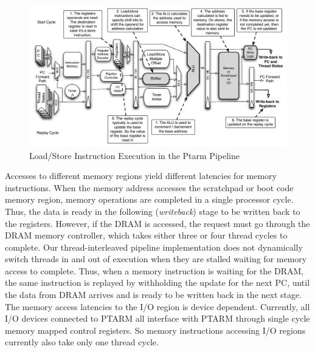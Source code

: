 \begin{figure}[h]
  \begin{center}
    \includegraphics[scale=.54]{figs/ldstr_pipeline_implementation}
  \end{center}
  \vspace{-3mm}
  \caption{Load/Store Instruction Execution in the Ptarm Pipeline}
  \label{fig:ldstr_pipeline_implementation}
\end{figure}

Accesses to different memory regions yield different latencies for memory instructions.
When the memory address accesses the scratchpad or boot code memory region, memory operations are completed in a single processor cycle.
Thus, the data is ready in the following (\emph{writeback}) stage to be written back to the registers.
However, if the DRAM is accessed, the request must go through the DRAM memory controller, which takes either three or four thread cycles to complete.
Our thread-interleaved pipeline implementation does not dynamically switch threads in and out of execution when they are stalled waiting for memory access to complete. 
Thus, when a memory instruction is waiting for the DRAM, the same instruction is replayed by withholding the update for the next PC, until the data from DRAM arrives and is ready to be written back in the next stage.
The memory access latencies to the I/O region is device dependent.   
Currently, all I/O devices connected to PTARM all interface with PTARM through single cycle memory mapped control registers.
So memory instructions accessing I/O regions currently also take only one thread cycle.  

